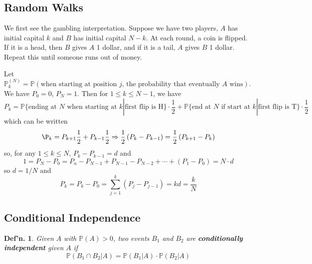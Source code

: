 \documentclass[12pt, a4paper]{book}
\renewcommand{\Pr}{\mathbb{P}}
\newtheorem{definition}[theorem]{Def'n.}
\theoremstyle{nonumberplain}
\begin{document}
\subsection{Random Walks}
We first see the gambling interpretation.
Suppose we have two players, $A$ has initial capital $k$ and $B$ has initial capital $N-k$.
At each round, a coin is flipped.
If it is a head, then $B$ gives $A$ 1 dollar, and if it is a tail, $A$ gives $B$ 1 dollar.
Repeat this until someone runs out of money.
\begin{center}
\end{center}
Let $\Pr_k^{(N)}=\Pr(\text{when starting at position $j$, the probability that eventually $A$ wins})$.
We have $P_0=0$, $P_N=1$.
Then for $1\leq k\leq N-1$, we have
\[P_k=\Pr\{\text{ending at $N$ when starting at $k$}|\text{first flip is H}\}\cdot\frac{1}{2}+\Pr\{\text{end at $N$ if start at $k$}|\text{first flip is T}\}\cdot\frac{1}{2}\]
which can be written
\[\P_k=P_{k+1}\frac{1}{2}+P_{k-1}\frac{1}{2}\Rightarrow \frac{1}{2}\left(P_k-P_{k-1}\right)=\frac{1}{2}\left(P_{k+1}-P_k\right)\]
so, for any $1\leq k\leq N$, $P_k-P_{k-1}=d$ and
\[1=P_N-P_0=P_n-P_{N-1}+P_{N-1}-P_{N-2}+\cdots+(P_1-P_0)=N\cdot d\]
so $d=1/N$ and
\[P_k=P_k-P_0=\sum\limits_{j=1}^k(P_j-P_{j-1})=kd=\frac{k}{N}\]
\subsection{Conditional Independence}
\begin{definition}
    Given $A$ with $\Pr(A)>0$, two events $B_1$ and $B_2$ are \textbf{conditionally independent} given $A$ if
    \[\Pr(B_1\cap B_2|A)=\Pr(B_1|A)\cdot\Pr(B_2|A)\]
\end{definition}
\end{document}

